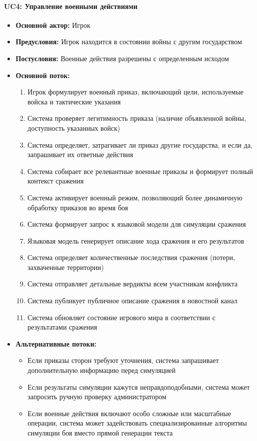 \paragraph{UC4: Управление военными действиями}

\begin{itemize}
    \item \textbf{Основной актор:} Игрок
    \item \textbf{Предусловия:} Игрок находится в состоянии войны с другим государством
    \item \textbf{Постусловия:} Военные действия разрешены с определенным исходом
    \item \textbf{Основной поток:}
    \begin{enumerate}
        \item Игрок формулирует военный приказ, включающий цели, используемые войска и тактические указания
        \item Система проверяет легитимность приказа (наличие объявленной войны, доступность указанных войск)
        \item Система определяет, затрагивает ли приказ другие государства, и если да, запрашивает их ответные действия
        \item Система собирает все релевантные военные приказы и формирует полный контекст сражения
        \item Система активирует военный режим, позволяющий более динамичную обработку приказов во время боя
        \item Система формирует запрос к языковой модели для симуляции сражения
        \item Языковая модель генерирует описание хода сражения и его результатов
        \item Система определяет количественные последствия сражения (потери, захваченные территории)
        \item Система отправляет детальные вердикты всем участникам конфликта
        \item Система публикует публичное описание сражения в новостной канал
        \item Система обновляет состояние игрового мира в соответствии с результатами сражения
    \end{enumerate}
    \item \textbf{Альтернативные потоки:}
    \begin{itemize}
        \item Если приказы сторон требуют уточнения, система запрашивает дополнительную информацию перед симуляцией
        \item Если результаты симуляции кажутся неправдоподобными, система может запросить ручную проверку администратором
        \item Если военные действия включают особо сложные или масштабные операции, система может задействовать специализированные алгоритмы симуляции боя вместо прямой генерации текста
    \end{itemize}
\end{itemize}


